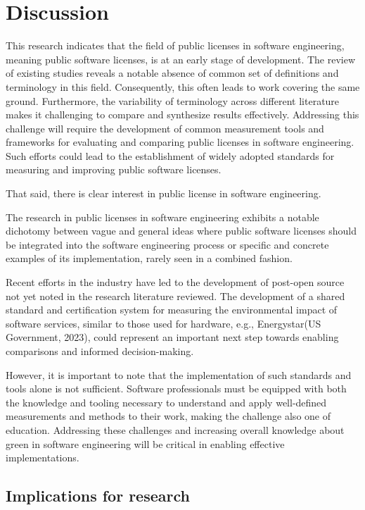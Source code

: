 \chapter{Discussion\label{discussion}}
This research indicates that the field of public licenses in software engineering, meaning public software licenses, is at an early stage of development. The review of existing studies reveals a notable absence of common set of definitions and terminology in this field. Consequently, this often leads to work covering the same ground. Furthermore, the variability of terminology across different literature makes it challenging to compare and synthesize results effectively. Addressing this challenge will require the development of common measurement tools and frameworks for evaluating and comparing public licenses in software engineering. Such efforts could lead to the establishment of widely adopted standards for measuring and improving public software licenses.

That said, there is clear interest in public license in software engineering. 

The research in public licenses in software engineering exhibits a notable dichotomy between vague and general ideas where public software licenses should be integrated into the software engineering process or specific and concrete examples of its implementation, rarely seen in a combined fashion.

Recent efforts in the industry have led to the development of post-open source not yet noted in the research literature reviewed. 
The development of a shared standard and certification system for measuring the environmental impact of software services, similar to those used for hardware, e.g., Energystar(US Government, 2023), could represent an important next step towards enabling comparisons and informed decision-making.

However, it is important to note that the implementation of such standards and tools alone is not sufficient. Software professionals must be equipped with both the knowledge and tooling necessary to understand and apply well-defined measurements and methods to their work, making the challenge also one of education. Addressing these challenges and increasing overall knowledge about green in software engineering will be critical in enabling effective implementations.

\section{Implications for research}

